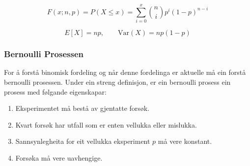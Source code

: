 \begin{equation}
    F(x; n, p) = P(X \leq x) = \sum_{i = 0}^{x} \binom{n}{i}p^i(1-p)^{n-i}
\end{equation}

\begin{equation}
    E[X] = np, \qquad \text{Var}(X) = np(1-p)
\end{equation}

\subsubsection{Bernoulli Prosessen} \label{chap:bernoulli}
For å forstå binomisk fordeling og når denne fordelinga er aktuelle må ein forstå bernoulli prosessen. Under ein streng definisjon, er ein bernoulli prosess ein prosess med følgande eigenskapar:

\begin{enumerate}
    \item Eksperimentet må bestå av gjentatte forsøk.
    \item Kvart forsøk har utfall som er enten vellukka eller mislukka.
    \item Sannsynlegheita for eit vellukka eksperiment $p$ må vere konstant.
    \item Forsøka må vere uavhengige.
\end{enumerate}

